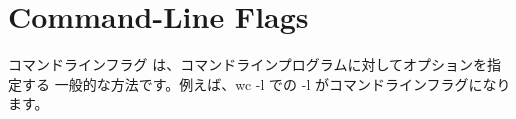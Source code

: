 \section{Command-Line Flags}

コマンドラインフラグ は、コマンドラインプログラムに対してオプションを指定する 一般的な方法です。例えば、wc -l での -l がコマンドラインフラグになります。




